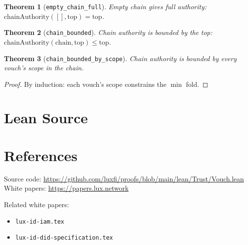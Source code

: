 \documentclass[11pt]{article}
\newtheorem{theorem}{Theorem}
\begin{document}
\begin{theorem}[\texttt{empty\_chain\_full}]
Empty chain gives full authority: $\text{chainAuthority}([], \text{top}) = \text{top}$.
\end{theorem}

\begin{theorem}[\texttt{chain\_bounded}]
Chain authority is bounded by the top: $\text{chainAuthority}(\text{chain}, \text{top}) \leq \text{top}$.
\end{theorem}

\begin{theorem}[\texttt{chain\_bounded\_by\_scope}]
Chain authority is bounded by every vouch's scope in the chain.
\end{theorem}
\begin{proof}
By induction: each vouch's scope constrains the $\min$ fold.
\end{proof}


\section{Lean Source}


\section{References}
\noindent Source code: \url{https://github.com/luxfi/proofs/blob/main/lean/Trust/Vouch.lean}\\
\noindent White papers: \url{https://papers.lux.network}

\noindent Related white papers:
\begin{itemize}
  \item \texttt{lux-id-iam.tex}
  \item \texttt{lux-id-did-specification.tex}
\end{itemize}
\end{document}
